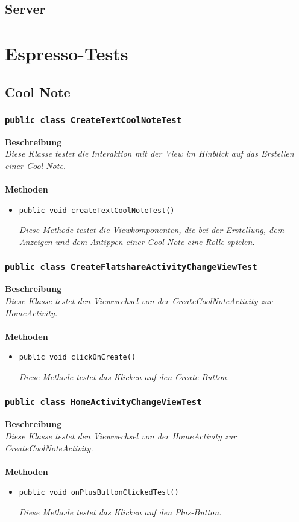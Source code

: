 \documentclass[a4paper]{scrreprt}
\begin{document}
	\section{Server}
	
	
	\chapter{Espresso-Tests}
	\section{Cool Note}
	\subsection{\texttt{public class CreateTextCoolNoteTest}}
	\textbf{Beschreibung}\\
	\textit{Diese Klasse testet die Interaktion mit der View im Hinblick auf das Erstellen einer Cool Note.}\\
	\\
	\textbf{Methoden}
	\begin{itemize}
		
		\item\texttt{{public void createTextCoolNoteTest()}}
		
		\textit{Diese Methode testet die Viewkomponenten, die bei der Erstellung, dem Anzeigen und dem Antippen einer Cool Note eine Rolle spielen.}
		
	\end{itemize}
	\subsection{\texttt{public class CreateFlatshareActivityChangeViewTest}}
	\textbf{Beschreibung}\\
	\textit{Diese Klasse testet den Viewwechsel von der CreateCoolNoteActivity zur HomeActivity.}\\
	\\
	\textbf{Methoden}
	\begin{itemize}
		
		\item\texttt{{public void clickOnCreate()}}
		
		\textit{Diese Methode testet das Klicken auf den Create-Button.}
		
	\end{itemize}	
	\subsection{\texttt{public class HomeActivityChangeViewTest}}
	\textbf{Beschreibung}\\
	\textit{Diese Klasse testet den Viewwechsel von der HomeActivity zur CreateCoolNoteActivity.}\\
	\\
	\textbf{Methoden}
	\begin{itemize}
		
		\item\texttt{{public void onPlusButtonClickedTest()}}
		
		\textit{Diese Methode testet das Klicken auf den Plus-Button.}
		
	\end{itemize}
\end{document}
